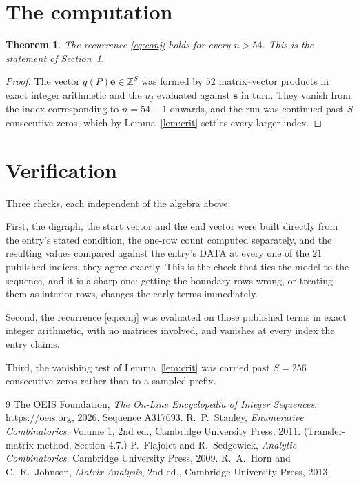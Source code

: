 \documentclass[11pt,a4paper]{article}
\theoremstyle{plain}
\newtheorem{theorem}{Theorem}
\theoremstyle{definition}
\begin{document}
\section{The computation}

\begin{theorem}
The recurrence \eqref{eq:conj} holds for every $n>54$. This is the statement of
Section~1.
\end{theorem}

\begin{proof}
The vector $q(P)\mathbf{e}\in\mathbb{Z}^{S}$ was formed by $52$ matrix--vector
products in exact integer arithmetic and the $u_j$ evaluated against $\mathbf{s}$ in turn.
They vanish from the index corresponding to $n=54+1$ onwards, and the run was continued
past $S$ consecutive zeros, which by Lemma~\ref{lem:crit} settles every larger index.
\end{proof}

\section{Verification}

Three checks, each independent of the algebra above.

First, the digraph, the start vector and the end vector were built directly from the
entry's stated condition, the one-row count computed separately, and the resulting values
compared against the entry's DATA at every one of the $21$ published indices; they
agree exactly. This is the check that ties the model to the sequence, and it is a sharp one:
getting the boundary rows wrong, or treating them as interior rows, changes the early terms
immediately.

Second, the recurrence \eqref{eq:conj} was evaluated on those published terms in exact
integer arithmetic, with no matrices involved, and vanishes at every index the entry claims.

Third, the vanishing test of Lemma~\ref{lem:crit} was carried past $S=256$ consecutive
zeros rather than to a sampled prefix.

\begin{thebibliography}{9}
 The OEIS Foundation, \emph{The On-Line Encyclopedia of Integer
Sequences}, \url{https://oeis.org}, 2026. Sequence A317693.
 R.~P.~Stanley, \emph{Enumerative Combinatorics}, Volume 1, 2nd ed.,
Cambridge University Press, 2011. (Transfer-matrix method, Section 4.7.)
 P.~Flajolet and R.~Sedgewick, \emph{Analytic Combinatorics}, Cambridge
University Press, 2009.
 R.~A.~Horn and C.~R.~Johnson, \emph{Matrix Analysis}, 2nd ed., Cambridge
University Press, 2013.
\end{thebibliography}
\end{document}
